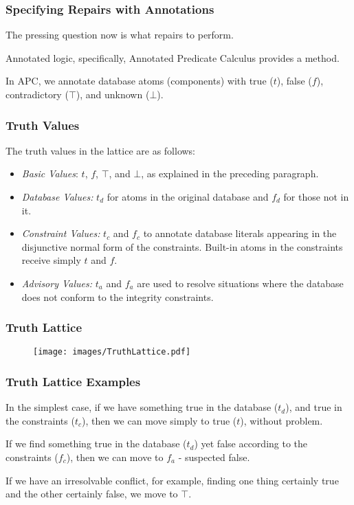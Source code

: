 \begin{frame}
\frametitle{Specifying Repairs with Annotations}

The pressing question now is what repairs to perform. 

Annotated logic, specifically, \alert{Annotated Predicate Calculus} provides a method.

In APC, we annotate database atoms (components) with true ($t$), false ($f$), contradictory ($\top$), and unknown ($\bot$).


\end{frame}

\begin{frame}
\frametitle{Truth Values}

The truth values in the lattice are as follows:

\begin{itemize}
\item \textit{Basic Values}: $t$, $f$, $\top$, and $\bot$, as explained in the preceding paragraph. 
\item \textit{Database Values:} $t_d$ for atoms in the original database and $f_d$ for those not in it.
\item \textit{Constraint Values:} $t_c$ and $f_c$ to annotate database literals appearing in the disjunctive normal form of the constraints. Built-in atoms in the constraints receive simply $t$ and $f$.
\item \textit{Advisory Values:} $t_a$ and $f_a$ are used to resolve situations where the database does not conform to the integrity constraints. 
\end{itemize}



\end{frame}

\begin{frame}
\frametitle{Truth Lattice}

\begin{figure}[!h]
  \centering \texttt{[image: images/TruthLattice.pdf]}
\end{figure}


\end{frame}

\begin{frame}
\frametitle{Truth Lattice Examples}

In the simplest case, if we have something true in the database ($t_d$), and true in the constraints ($t_c$), then we can move simply to true ($t$), without problem. 

If we find something true in the database ($t_d$) yet false according to the constraints ($f_c$), then we can move to $f_a$ - suspected false. 

If we have an irresolvable conflict, for example, finding one thing certainly true and the other certainly false, we move to $\top$.

\end{frame}

